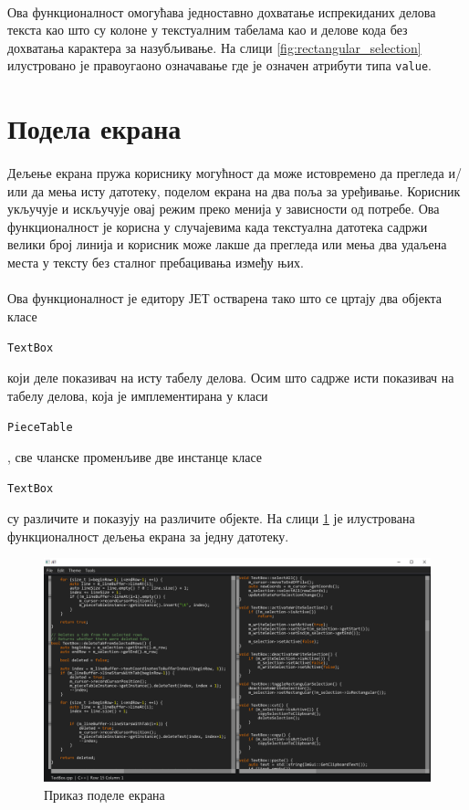\documentclass[12pt,oneside]{memoir}
\begin{document}
\paragraph{}
Ова функционалност омогућава једноставно дохватање испрекиданих делова
текста као што су колоне у текстуалним табелама као и делове кода без дохватања
карактера за назубљивање. На слици \ref{fig:rectangular_selection} илустровано
је правоугаоно означавање где је означен атрибути типа \verb*|value|.

\section{Подела екрана}

\paragraph{}
Дељење екрана пружа кориснику могућност да може истовремено да прегледа
и/или да мења исту датотеку, поделом екрана на два поља за уређивање. Корисник укључује и искључује овај режим преко менија у зависности од потребе. Ова функционалност је корисна у случајевима када текстуална датотека садржи велики број линија и корисник може лакше да прегледа или мења два удаљена места у тексту без сталног пребацивања између њих.

\paragraph{}
Ова функционалност је едитору ЈЕТ остварена тако што
се цртају два објекта класе \begin{latinica}\verb|TextBox|\end{latinica}
који деле показивач на исту табелу делова. Осим што садрже исти показивач
на табелу делова, која је имплементирана у класи
\begin{latinica}\verb|PieceTable|\end{latinica}, све чланске променљиве две инстанце класе \begin{latinica}\verb|TextBox|\end{latinica} су различите
и показују на различите објекте. На слици \ref{fig:split_screen} је илустрована
функционалност дељења екрана за једну датотеку.

\begin{figure}[!ht]
	\centering
	\includegraphics[width=1.0\textwidth]{images/split_screen.png}
	\caption{Приказ поделе екрана}
	\label{fig:split_screen}
\end{figure}
\end{document}

